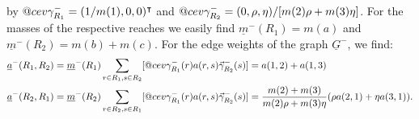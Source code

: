 \documentclass[reqno,12pt,letterpaper]{amsart}
\makeatletter
\numberwithin{equation}{section}
\DeclareRobustCommand{\cev}[1]{%
	\mathpalette\do@cev{#1}%
}
\newcommand{\do@cev}[2]{%
	\fix@cev{#1}{+}%
	\reflectbox{$\m@th#1\vec{\reflectbox{$\fix@cev{#1}{-}\m@th#1#2\fix@cev{#1}{+}$}}$}%
	\fix@cev{#1}{-}%
}
\newcommand{\fix@cev}[2]{%
	\ifx#1\displaystyle
	\mkern#23mu
	\else
	\ifx#1\textstyle
	\mkern#23mu
	\else
	\ifx#1\scriptstyle
	\mkern#22mu
	\else
	\mkern#22mu
	\fi
	\fi
	\fi
}
\newcommand{\1}{\mathds{1}}
\theoremstyle{definition}
\makeatother
\begin{document}
\noindent by $\cev{\gamma}^-_{R_1} = (1/m(1), 0 , 0)^\intercal$ and $\cev{\gamma}^-_{R_2} =  (0, \rho, \eta)/[m(2)\rho + m(3)\eta ]  $. For the masses of the respective reaches we easily find $\underline{m}^-(R_1) = m(a)$ and $\underline{m}^-(R_2) = m(b) + m(c)$. For the edge weights of the graph $\underline{G}^-$, we find:
\begin{align}
	\underline{a}^-(R_1,R_2) &= \underline{m}^-(R_1)\sum\limits_{r \in R_1, s \in R_2} 
	[
	\cev{\gamma}^{-}_{R_1}(r)
	a(r,s)
	\vec{\gamma}_{R_2}^{-}(s)
	] 
	= 
a(1,2) + a(1,3)\\
 	\underline{a}^-(R_2,R_1) &= \underline{m}^-(R_2)\sum\limits_{r \in R_2, s \in R_1} 
 [
 \cev{\gamma}^{-}_{R_1}(r)
 a(r,s)
 \vec{\gamma}_{R_2}^{-}(s)
 ] 
 = \frac{m(2) + m(3)}{m(2)\rho + m(3)\eta}(\rho a(2,1) + \eta a(3,1)).
\end{align}
\end{document}
